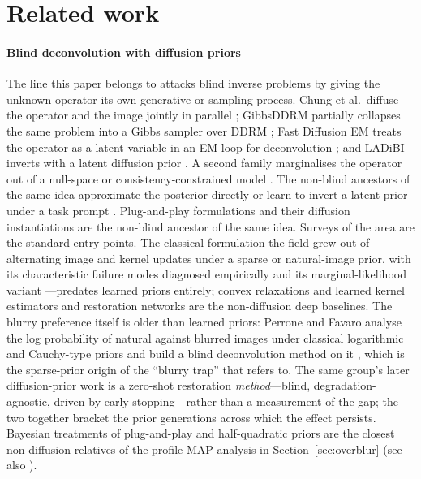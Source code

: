 \documentclass[10pt,journal]{IEEEtran}
\begin{document}
\section{Related work}
\label{sec:relwork}

\paragraph*{Blind deconvolution with diffusion priors}
The line this paper belongs to attacks blind inverse problems by giving the unknown operator its
own generative or sampling process. Chung et al.\ diffuse the operator and the image jointly in
parallel \cite{chung2023bdm}; GibbsDDRM partially collapses the same problem into a Gibbs
sampler over DDRM \cite{murata2023gibbsddrm}; Fast Diffusion EM treats the operator as a latent
variable in an EM loop for deconvolution \cite{laroche2024fastdiffusionem}; and LADiBI inverts
with a latent diffusion prior \cite{bai2026ladibi}. A second family marginalises the operator
out of a null-space or consistency-constrained model
\cite{song2023resample,wang2022ddsm,kawar2022ddrm}. The non-blind ancestors of the same idea
approximate the posterior directly \cite{chung2022dps} or learn to invert a latent prior under a
task prompt \cite{chung2023prompttuning}. Plug-and-play formulations
\cite{venkatakrishnan2013pnp,sreehari2016pnp} and their diffusion instantiations
\cite{zhu2023dpnp} are the non-blind ancestor of the same idea. Surveys of the area
\cite{daras2024survey,luo2025taming,zhang2025survey} are the standard entry points. The
classical formulation the field grew out of---alternating image and kernel updates under a
sparse or natural-image prior, with its characteristic failure modes diagnosed empirically
\cite{levin2009understanding,levin2011understanding} and its marginal-likelihood variant
\cite{levin2011efficient}---predates learned priors entirely; convex relaxations
\cite{ahmed2014blind} and learned kernel estimators \cite{xu2018motion,ren2020neural} and
restoration networks \cite{zamir2022restormer,chen2022nafnet} are the non-diffusion deep
baselines. The blurry preference itself is older than learned priors: Perrone and Favaro analyse
the log probability of natural against blurred images under classical logarithmic and Cauchy-type
priors and build a blind deconvolution method on it \cite{perrone2016logarithmic}, which is the
sparse-prior origin of the ``blurry trap'' that \cite{nguyen2025morsebott} refers to. The same
group's later diffusion-prior work \cite{chihaoui2025diip} is a zero-shot restoration
\emph{method}---blind, degradation-agnostic, driven by early stopping---rather than a measurement
of the gap; the two together bracket the prior generations across which the effect persists.
Bayesian treatments of plug-and-play and half-quadratic priors
\cite{laumont2022bayesian,kemajou2024marginal} are the closest non-diffusion relatives of the
profile-MAP analysis in Section~\ref{sec:overblur} (see also \cite{murphy2000profile}).
\end{document}
